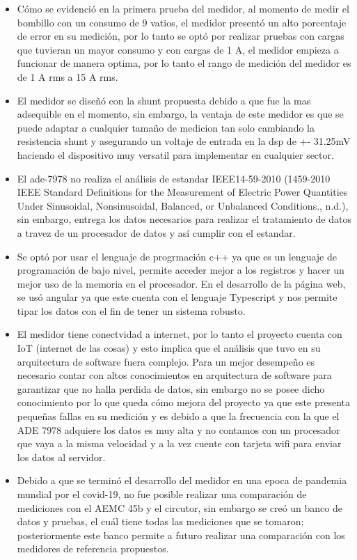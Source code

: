\begin{itemize}
    \item Cómo se evidenció en la primera prueba del medidor, al momento de medir el bombillo con un consumo de 9 vatios, el medidor presentó un alto porcentaje de error en su medición, por lo tanto se optó por realizar pruebas con cargas que tuvieran un mayor consumo y con cargas de 1 A, el medidor empieza a funcionar de manera optima, por lo tanto el rango de medición del medidor es de 1 A rms a 15 A rms.
    \item El medidor se diseñó con la shunt propuesta debido a que fue la mas adsequible en el momento, sin embargo, la ventaja de este medidor es que se puede adaptar a cualquier tamaño de medicion tan solo cambiando la resistencia shunt y asegurando un voltaje de entrada en la dsp de +- 31.25mV haciendo el dispositivo muy versatil para implementar en cualquier sector.
    \item El ade-7978 no realiza el análisis de estandar IEEE14-59-2010 (1459-2010 IEEE Standard Definitions for the Measurement of Electric Power Quantities Under Sinusoidal, Nonsinusoidal, Balanced, or Unbalanced Conditions., n.d.), sin embargo, entrega los datos necesarios para realizar el tratamiento de datos a travez de un procesador de datos y así cumplir con el estandar.
    \item Se optó por usar el lenguaje de progrmación c++ ya que es un lenguaje de programación de bajo nivel, permite acceder mejor a los registros y hacer un mejor uso de la memoria en el procesador. En el desarrollo de la página web, se usó angular ya que este cuenta con el lenguaje Typescript y nos permite tipar los datos con el fin de tener un sistema robusto.
    \item El medidor tiene conectvidad a internet, por lo tanto el proyecto cuenta con IoT (internet de las cosas) y esto implica que el análisis que tuvo en su arquitectura de software fuera complejo. Para un mejor desempeño es necesario contar con  altos conocimientos en arquitectura de software para garantizar que no halla perdida de datos, sin embargo no se posee dicho conocimiento por lo que queda cómo mejora del proyecto ya que este presenta pequeñas fallas en su medición y es debido a que la frecuencia con la que el ADE 7978 adquiere los datos es muy alta y no contamos con un procesador que vaya a la misma velocidad y a la vez cuente con tarjeta wifi para enviar los datos al servidor.
    \item Debido a que se terminó el desarrollo del medidor en una epoca de pandemia mundial por el covid-19, no fue posible realizar una comparación de mediciones con el AEMC 45b y el circutor, sin embargo se creó un banco de datos y pruebas, el cuál tiene todas las mediciones que se tomaron; posteriormente este banco permite a futuro realizar una comparación con los medidores de referencia propuestos.

\end{itemize}
